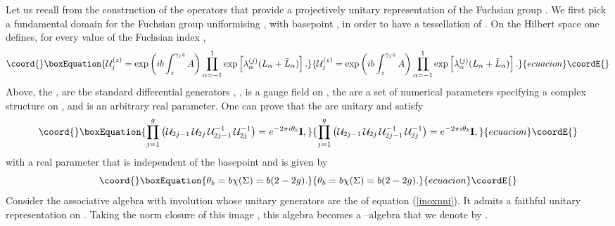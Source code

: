 \documentclass[a4paper,a4paper]{article}
\begin{document}
Let us recall from \cite{PROCEEDINGS} the construction of the operators 
\coordHE{} that provide a projectively unitary 
representation \coordHE{} of the Fuchsian group \myHighlight{$\Gamma$}\coordHE{}.
We first pick a fundamental domain \coordHE{} for the 
Fuchsian group \myHighlight{$\Gamma$}\coordHE{} uniformising \myHighlight{$\Sigma$}\coordHE{}, with basepoint  
\coordHE{}, in order to have a tessellation \coordHE{} of \coordHE{}.   
On the Hilbert space \coordHE{} one defines,   
for every value of the Fuchsian index \coordHE{}, 
\begin{equation}\coord{}\boxEquation{  
{\cal U}_j^{(z)}={\rm exp}\left(ib\int_z^{\gamma_j z} A\right)  
\prod_{\alpha=-1}^1{\rm  
exp}\left[\lambda_{\alpha}^{(j)}(L_{\alpha}+\bar L_{\alpha})\right].
\label{genu}
}{  
{\cal U}_j^{(z)}={\rm exp}\left(ib\int_z^{\gamma_j z} A\right)  
\prod_{\alpha=-1}^1{\rm  
exp}\left[\lambda_{\alpha}^{(j)}(L_{\alpha}+\bar L_{\alpha})\right].
}{ecuacion}\coordE{}\end{equation}  
Above, the \coordHE{}, \coordHE{} are the standard 
\coordHE{} differential generators \coordHE{}, 
\coordHE{}, \coordHE{} 
is a gauge field on \coordHE{}, 
the \coordHE{} are a set of numerical parameters specifying  
a complex structure on \myHighlight{$\Sigma$}\coordHE{}, and \coordHE{} is an arbitrary real parameter.
One can prove that the \coordHE{} are unitary 
and satisfy 
\begin{equation}\coord{}\boxEquation{  
\prod_{j=1}^g\left({\cal U}_{2j-1}\,{\cal U}_{2j}\,{\cal U}_{2j-1}^{-1}\,  
{\cal U}_{2j}^{-1}\right)=e^{-2\pi i\theta_b}{{\bf  I}},  
\label{inoxnni}
}{  
\prod_{j=1}^g\left({\cal U}_{2j-1}\,{\cal U}_{2j}\,{\cal U}_{2j-1}^{-1}\,  
{\cal U}_{2j}^{-1}\right)=e^{-2\pi i\theta_b}{{\bf  I}},  
}{ecuacion}\coordE{}\end{equation}  
with \coordHE{} a real parameter that is independent of the basepoint \coordHE{} 
and is given by 
\begin{equation}\coord{}\boxEquation{
\theta_b=b\chi(\Sigma)=b(2-2g).
\label{valueoftheta}
}{
\theta_b=b\chi(\Sigma)=b(2-2g).
}{ecuacion}\coordE{}\end{equation}
Consider the associative algebra with involution whose unitary generators 
are the \coordHE{} of equation (\ref{inoxnni}). 
It admits a faithful unitary representation on \coordHE{}. 
Taking the norm closure of this image \cite{NCG}, this algebra becomes 
a \coordHE{}--algebra that we denote by \coordHE{}. 
\end{document}
